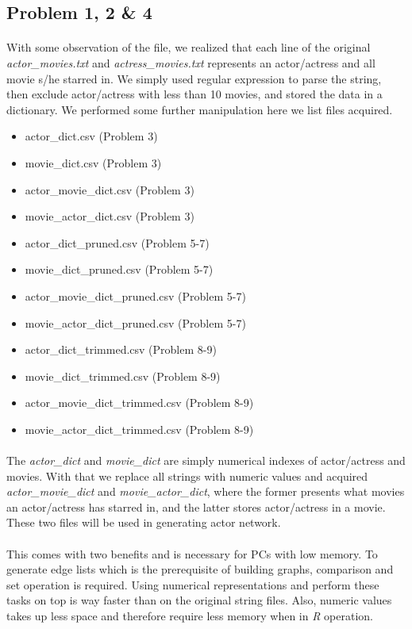 \subsection*{Problem 1, 2 \& 4}

\paragraph{}
With some observation of the file, we realized that each line of the original \textit{actor\_movies.txt} and \textit{actress\_movies.txt} represents an actor/actress and all movie s/he starred in. We simply used regular expression to parse the string, then exclude actor/actress with less than 10 movies, and stored the data in a dictionary. We performed some further manipulation here we list files acquired.
\begin{itemize}
	\item actor\_dict.csv (Problem 3)
	\item movie\_dict.csv (Problem 3)
	\item actor\_movie\_dict.csv (Problem 3)
	\item movie\_actor\_dict.csv (Problem 3)
	\item actor\_dict\_pruned.csv (Problem 5-7)
	\item movie\_dict\_pruned.csv (Problem 5-7)
	\item actor\_movie\_dict\_pruned.csv (Problem 5-7)
	\item movie\_actor\_dict\_pruned.csv (Problem 5-7)
	\item actor\_dict\_trimmed.csv (Problem 8-9)
	\item movie\_dict\_trimmed.csv (Problem 8-9)
	\item actor\_movie\_dict\_trimmed.csv (Problem 8-9)
	\item movie\_actor\_dict\_trimmed.csv (Problem 8-9)
\end{itemize}
\paragraph{}
The \textit{actor\_dict} and \textit{movie\_dict} are simply numerical indexes of actor/actress and movies. With that we replace all strings with numeric values and acquired \textit{actor\_movie\_dict} and \textit{movie\_actor\_dict}, where the former presents what movies an actor/actress has starred in, and the latter stores actor/actress in a movie. These two files will be used in generating actor network.
\paragraph{}
This comes with two benefits and is necessary for PCs with low memory. To generate edge lists which is the prerequisite of building graphs, comparison and set operation is required. Using numerical representations and perform these tasks on top is way faster than on the original string files. Also, numeric values takes up less space and therefore require less memory when in \textit{R} operation. 
